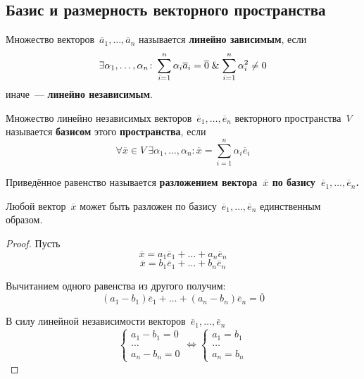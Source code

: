 \subsection{Базис и размерность векторного пространства}
Множество векторов~$\overline a_1, \ldots, \overline a_n$ называется \textbf{линейно зависимым}, если
\begin{equation*}
\exists \alpha_1, \ldots, \alpha_n \colon
\sum_{i=1}^n \alpha_i \overline a_i = \overline 0 \mathrel{\&}
\sum_{i=1}^n \alpha_i^2 \neq 0
\end{equation*}
иначе~--- \textbf{линейно независимым}.

 Множество линейно независимых векторов~$\overline e_1, \ldots, \overline e_n$ векторного пространства~$V$ называется \textbf{базисом} этого \textbf{пространства}, если
\begin{equation*}
\forall \overline x \in V \
\exists \alpha_1, \ldots, \alpha_n \colon
\overline x = \sum_{i=1}^n \alpha_i \overline e_i
\end{equation*}

Приведённое равенство называется \textbf{разложением вектора~$\overline x$ по базису~$\overline e_1, \ldots, \overline e_n$.}

\begin{theorem}[о~базисе]
Любой вектор~$\overline x$ может быть разложен по базису~$\overline e_1, \ldots, \overline e_n$ единственным образом.
\end{theorem}
\begin{proof}
Пусть
\begin{equation*}
\overline x = a_1 \overline e_1 + \ldots + a_n \overline e_n
\end{equation*}
\begin{equation*}
\overline x = b_1 \overline e_1 + \ldots + b_n \overline e_n
\end{equation*}

Вычитанием одного равенства из другого получим:
\begin{equation*}
(a_1 - b_1) \overline e_1 + \ldots + (a_n - b_n) \overline e_n = \overline 0
\end{equation*}

В силу линейной независимости векторов~$\overline e_1, \ldots, \overline e_n$
\begin{equation*}
\begin{cases}
a_1 - b_1 = 0 \\
\ldots \\
a_n - b_n = 0
\end{cases}
\Leftrightarrow
\begin{cases}
a_1 = b_1 \\
\ldots \\
a_n = b_n
\end{cases}
\end{equation*}
\end{proof}

